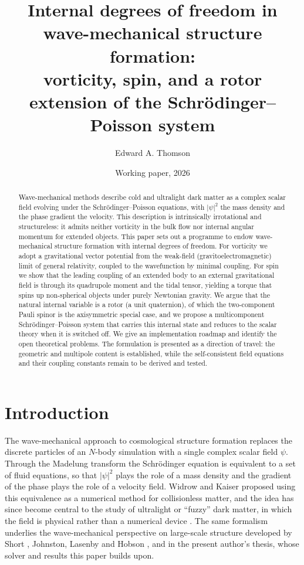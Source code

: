 \documentclass[11pt,a4paper]{article}
\title{Internal degrees of freedom in wave-mechanical structure formation:\\
vorticity, spin, and a rotor extension of the Schr\"odinger--Poisson system}
\author{Edward A. Thomson}
\date{Working paper, 2026}
\begin{document}
\maketitle

\begin{abstract}
\noindent
Wave-mechanical methods describe cold and ultralight dark matter as a complex scalar
field evolving under the Schr\"odinger--Poisson equations, with $|\psi|^2$ the mass
density and the phase gradient the velocity. This description is intrinsically
irrotational and structureless: it admits neither vorticity in the bulk flow nor
internal angular momentum for extended objects. This paper sets out a programme to
endow wave-mechanical structure formation with internal degrees of freedom. For
vorticity we adopt a gravitational vector potential from the weak-field
(gravitoelectromagnetic) limit of general relativity, coupled to the wavefunction by
minimal coupling. For spin we show that the leading coupling of an extended body to an
external gravitational field is through its quadrupole moment and the tidal tensor,
yielding a torque that spins up non-spherical objects under purely Newtonian gravity.
We argue that the natural internal variable is a rotor (a unit quaternion), of which
the two-component Pauli spinor is the axisymmetric special case, and we propose a
multicomponent Schr\"odinger--Poisson system that carries this internal state and
reduces to the scalar theory when it is switched off. We give an implementation roadmap
and identify the open theoretical problems. The formulation is presented as a direction
of travel: the geometric and multipole content is established, while the
self-consistent field equations and their coupling constants remain to be derived and
tested.
\end{abstract}

\section{Introduction}
\label{sec:intro}

The wave-mechanical approach to cosmological structure formation replaces the discrete
particles of an $N$-body simulation with a single complex scalar field $\psi$. Through
the Madelung transform \citep{madelung1927} the Schr\"odinger equation is equivalent to
a set of fluid equations, so that $|\psi|^2$ plays the role of a mass density and the
gradient of the phase plays the role of a velocity field. Widrow and Kaiser
\citep{widrow_kaiser1993} proposed using this equivalence as a numerical method for
collisionless matter, and the idea has since become central to the study of ultralight
or ``fuzzy'' dark matter, in which the field is physical rather than a numerical device
\citep{hu2000,schive2014,mocz2017}. The same formalism underlies the wave-mechanical
perspective on large-scale structure developed by Short \citep{short2007}, Johnston,
Lasenby and Hobson \citep{johnston2010}, and in the present author's thesis, whose
solver and results this paper builds upon.
\end{document}
